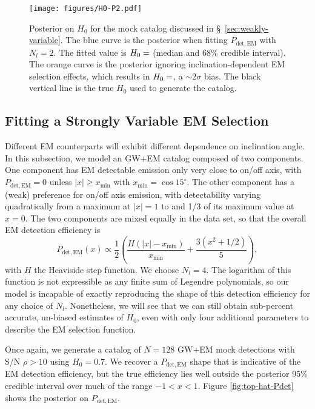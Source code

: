 \documentclass[modern]{aastex631}
\newcommand{\detected}{\mathrm{det}}
\newcommand{\EM}{\mathrm{EM}}
\begin{document}
\begin{figure}
    \texttt{[image: figures/H0-P2.pdf]}
    \caption{Posterior on $H_0$ for the mock catalog discussed in \S\,
    \ref{sec:weakly-variable}.  The blue curve is the posterior when fitting
    $P_{\detected,\EM}$ with $N_l = 2$.  The fitted value is $H_0 =
    \variable{output/H0-P2.txt}$ (median and 68\% credible interval).  The
    orange curve is the posterior ignoring inclination-dependent EM selection
    effects, which results in $H_0 = \variable{output/H0-P2-nofit.txt}$, a $\sim
    2\sigma$ bias.  The black vertical line is the true $H_0$ used to generate
    the catalog.}
    \label{fig:H0-P2}
\end{figure}

\subsection{Fitting a Strongly Variable EM Selection}
\label{sec:strongly-variable}

Different EM counterparts will exhibit different dependence on inclination
angle.  In this subsection, we model an GW+EM catalog composed of two
components.  One component has EM detectable emission only very close to on/off
axis, with $P_{\detected,\EM} = 0$ unless $|x| \geq x_\mathrm{min}$ with
$x_\mathrm{min} = \cos 15^\circ$.  The other component has a (weak) preference
for on/off axis emission, with detectability varying quadratically from a
maximum at $|x| = 1$ to and 1/3 of its maximum value at $x = 0$.  The two
components are mixed equally in the data set, so that the overall EM detection
efficiency is 
\begin{equation}
    P_{\detected,\EM}(x) \propto \frac{1}{2} \left( \frac{H\left( |x| - x_\mathrm{min} \right)}{x_\mathrm{min}} + \frac{3 \left( x^2 + 1/2 \right)}{5} \right),
\end{equation}
with $H$ the Heaviside step function.  We choose $N_l = 4$.  The logarithm of
this function is not expressible as any finite sum of Legendre polynomials, so
our model is incapable of exactly reproducing the shape of this detection
efficiency for any choice of $N_l$.  Nonetheless, we will see that we can still
obtain sub-percent accurate, un-biased estimates of $H_0$, even with only four
additional parameters to describe the EM selection function.

Once again, we generate a catalog of $N = 128$ GW+EM mock detections with S/N
$\rho > 10$ using $H_0 = 0.7$.  We recover a $P_{\detected,\EM}$ shape that is
indicative of the EM detection efficiency, but the true efficiency lies well
outside the posterior 95\% credible interval over much of the range $-1 < x <
1$.  Figure \ref{fig:top-hat-Pdet} shows the posterior on $P_{\detected,\EM}$.
\end{document}
